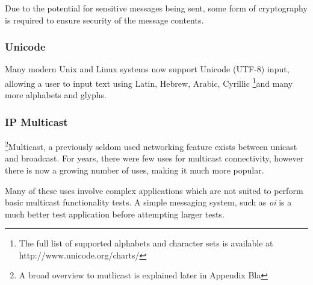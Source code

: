 Due to the potential for sensitive messages being sent, some form of
cryptography is required to ensure security of the message contents.

\subsubsection{Unicode}

Many modern Unix and Linux systems now support Unicode (UTF-8) input,
allowing a user to input text using Latin, Hebrew, Arabic, Cyrillic
\footnote{The full list of supported alphabets and character sets is available at http://www.unicode.org/charts/}{and many more}
alphabets and glyphs. 

\subsubsection{IP Multicast}

\footnote{A broad overview to mutlicast is explained later in Appendix Bla}{Multicast}, a previously seldom used networking feature exists 
between unicast and broadcast. For years, there were few uses for
multicast connectivity, however there is now a growing number of uses,
making it much more popular. 


Many of these uses involve complex applications which are not suited to
perform basic multicast functionality tests. A simple messaging system,
such as \emph{oi} is a much better test application before attempting 
larger tests.
